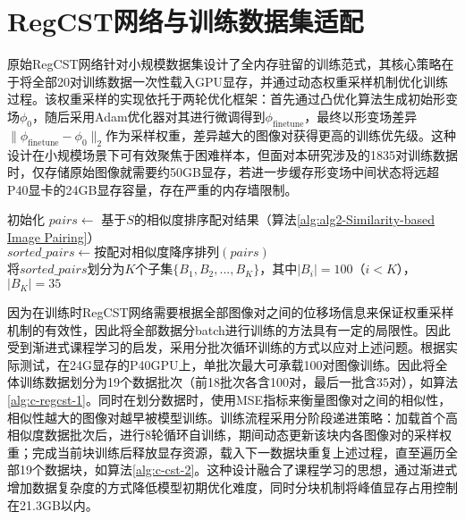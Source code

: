

\section{RegCST网络与训练数据集适配}

原始RegCST网络针对小规模数据集设计了全内存驻留的训练范式，其核心策略在于将全部20对训练数据一次性载入GPU显存，并通过动态权重采样机制优化训练过程。该权重采样的实现依托于两轮优化框架：首先通过凸优化算法生成初始形变场$\phi_0$，随后采用Adam优化器对其进行微调得到$\phi_{\text{finetune}}$，最终以形变场差异$\|\phi_{\text{finetune}} - \phi_0\|_2$作为采样权重，差异越大的图像对获得更高的训练优先级。这种设计在小规模场景下可有效聚焦于困难样本，但面对本研究涉及的1835对训练数据时，仅存储原始图像就需要约50GB显存，若进一步缓存形变场中间状态将远超P40显卡的24GB显存容量，存在严重的内存墙限制。

\begin{algorithm}[h]
    \label{alg:datablock}
    初始化 $pairs \gets$ 基于$S$的相似度排序配对结果（算法\ref{alg:alg2-Similarity-based Image Pairing}） \\
    $sorted\_pairs \gets \text{按配对相似度降序排列}(pairs)$ \\
    将$sorted\_pairs$划分为$K$个子集$\{B_1,B_2,...,B_K\}$，其中$|B_i|=100$（$i<K$），$|B_K|=35$ \\
    \label{alg:c-regcst-1}
\end{algorithm}

因为在训练时RegCST网络需要根据全部图像对之间的位移场信息来保证权重采样机制的有效性，因此将全部数据分batch进行训练的方法具有一定的局限性。因此受到渐进式课程学习的启发，采用分批次循环训练的方式以应对上述问题。根据实际测试，在24G显存的P40GPU上，单批次最大可承载100对图像训练。因此将全体训练数据划分为19个数据批次（前18批次各含100对，最后一批含35对），如算法\ref{alg:c-regcst-1}。同时在划分数据时，使用MSE指标来衡量图像对之间的相似性，相似性越大的图像对越早被模型训练。训练流程采用分阶段递进策略：加载首个高相似度数据批次后，进行8轮循环自训练，期间动态更新该块内各图像对的采样权重；完成当前块训练后释放显存资源，载入下一数据块重复上述过程，直至遍历全部19个数据块，如算法\ref{alg:c-cst-2}。这种设计融合了课程学习的思想，通过渐进式增加数据复杂度的方式降低模型初期优化难度，同时分块机制将峰值显存占用控制在21.3GB以内。

